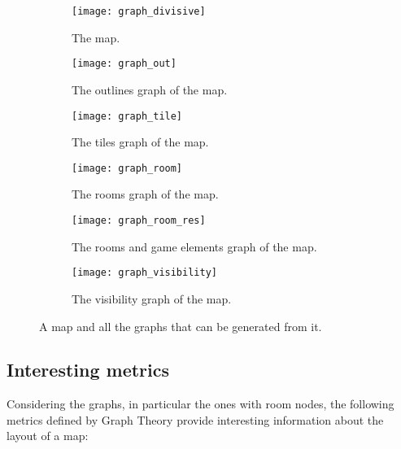 \begin{figure}[]
	\centering
	\hfill
  	\begin{subfigure}[t]{0.45\linewidth}
		\texttt{[image: graph\_divisive]}
     		\caption{The map.}
     		\label{img:graph_divisive}
 	\end{subfigure}
 	\hfill
  	\begin{subfigure}[t]{0.45\linewidth}
    		\texttt{[image: graph\_out]}
    		\caption{The outlines graph of the map.}
     		\label{img:graph_out}
  	\end{subfigure}
  	\hfill
  	
  	\hfill
  	\begin{subfigure}[t]{0.45\linewidth}
    		\texttt{[image: graph\_tile]}
    		\caption{The tiles graph of the map.}
     		\label{img:graph_tile}
  	\end{subfigure}
  	\hfill
  	\begin{subfigure}[t]{0.45\linewidth}
    		\texttt{[image: graph\_room]}
    		\caption{The rooms graph of the map.}
     		\label{img:graph_room}
 	\end{subfigure}
 	\hfill
 	
 	\hfill
  	\begin{subfigure}[t]{0.45\linewidth}
    		\texttt{[image: graph\_room\_res]}
    		\caption{The rooms and game elements graph of the map.}
     		\label{img:graph_room_res}
  	\end{subfigure}
  	\hfill
  	\begin{subfigure}[t]{0.45\linewidth}
    		\texttt{[image: graph\_visibility]}
    		\caption{The visibility graph of the map.}
     		\label{img:graph_visibility}
  	\end{subfigure}	
  	\hfill
	\caption{A map and all the graphs that can be generated from it.}
\end{figure}

\subsection{Interesting metrics}

Considering the graphs, in particular the ones with room nodes, the following metrics defined by Graph Theory provide interesting information about the layout of a map:

